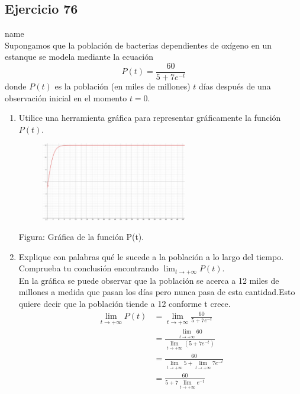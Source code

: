 \documentclass[12pt]{article}
\begin{document}
\subsection{Ejercicio 76} name \\

Supongamos que la población de bacterias dependientes de oxígeno en un estanque se modela mediante la ecuación
\[
P(t)=\frac{60}{5+7e^{-t}}
\]
donde $P(t)$ es la población (en miles de millones) $t$ días después de una observación inicial en el momento $t = 0$.
\begin{enumerate}
\item Utilice una herramienta gráfica para representar gráficamente la función $P(t)$.
  \begin{figure}[H]
\centering
\includegraphics[width=0.6\textwidth]{../img/img_Lista3/poblacionT.png}
  \end{figure}
 Figura: Gráfica de la función P(t).
\item Explique con palabras qué le sucede a la población a lo largo del tiempo. Comprueba tu conclusión encontrando $\lim_{t \to +\infty} P(t)$.\\
  En la gráfica se puede observar que la población se acerca a 12 miles de millones a medida que pasan los días pero nunca pasa de esta cantidad.Esto quiere decir que la población tiende a 12 conforme t crece.\\


\[ \begin{equation*}
  \begin{split}
    \lim_{t \to +\infty} P(t)
    &= \lim_{t \to +\infty} \frac{60}{5+7e^{-t}} \\
    &= \frac{ \lim_{t \to +\infty} 60}{ \lim_{t \to +\infty} (5+7e^{-t})} \\
    &= \frac{ 60}{ \lim_{t \to +\infty}5+  \lim_{t \to +\infty} 7e^{-t}} \\
   & =  \frac{ 60}{ 5+ 7  \lim_{t \to +\infty} e^{-t}}
 \end{split}
\end{equation*} \]
  

\end{enumerate}
\end{document}
